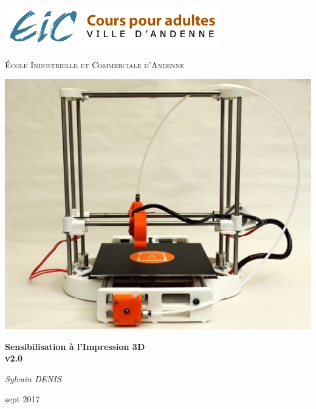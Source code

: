 \documentclass{article}
\begin{document}
\begin{titlepage}
	\centering
	\includegraphics[scale=0.5]{./images/EIC.png}\\
	{\scshape\LARGE École Industrielle et Commerciale d'Andenne\par}
	\vspace{1cm}
	\includegraphics[scale=0.5]{./images/dagoma.png}
	\vspace{1.5cm}
	{\huge\bfseries Sensibilisation à l'Impression 3D \\ v2.0\par}
	\vspace{1,5cm}
	{\Large\itshape Sylvain DENIS\par}
	{\Large sept 2017\par}
\end{titlepage}



\newpage
\tableofcontents
\newpage

\end{document}
